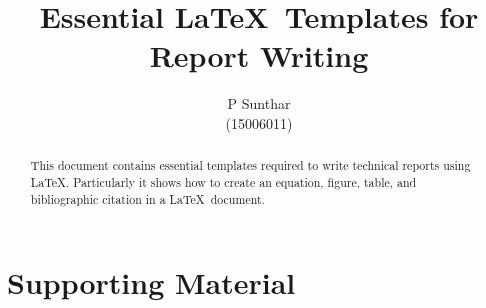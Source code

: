 \documentclass[twoside]{iitbreport}
\begin{document}
\title{Essential \LaTeX\ Templates for Report Writing}
\author{P Sunthar \\ (15006011)}










\maketitle

\begin{abstract}
This document contains essential templates required to write technical
reports using \LaTeX.  Particularly it shows how to create an
equation, figure, table, and bibliographic citation in a \LaTeX\
document.
\end{abstract}

\tableofcontents

\listoftables
\listoffigures

\cleardoublepage
\setcounter{page}{1}







\makeheadtoc{\bibname}



\appendix
\chapter{Supporting Material}
\end{document}
